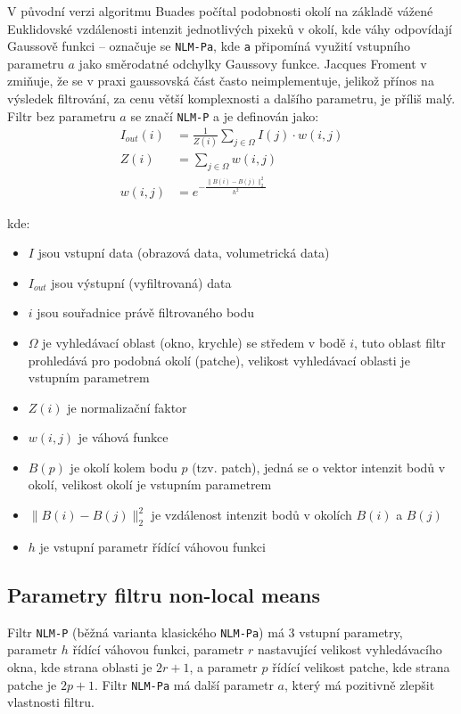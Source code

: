 V původní verzi algoritmu \cite{nlm2005:buades} Buades počítal podobnosti okolí na základě vážené Euklidovské vzdálenosti intenzit jednotlivých pixeků v okolí, kde váhy odpovídají Gaussově funkci -- označuje se \texttt{NLM-Pa}, kde \texttt{a} připomíná využití vstupního parametru $a$ jako směrodatné odchylky Gaussovy funkce. Jacques Froment v \cite{nlm2014:froment} zmiňuje, že se v praxi gaussovská část často neimplementuje, jelikož přínos na výsledek filtrování, za cenu větší komplexnosti a dalšího parametru, je příliš malý. Filtr bez parametru $a$ se značí \texttt{NLM-P} a je definován jako: 
\begin{align}
    \label{eq:nlm}
    I_{out}(i) &= \frac{1}{Z(i)}\displaystyle\sum_{j\in\Omega}{I(j) \cdot w(i, j)} \\
    Z(i) &= \displaystyle\sum_{j\in\Omega}{w(i, j)} \\
    w(i, j) &= e^{-\frac{\|B(i) - B(j)\|_2^2}{h^2}}
\end{align}

kde:
\begin{itemize}
    \item $I$ jsou vstupní data (obrazová data, volumetrická data)
    \item $I_{out}$ jsou výstupní (vyfiltrovaná) data
    \item $i$ jsou souřadnice právě filtrovaného bodu
    \item $\Omega$ je vyhledávací oblast (okno, krychle) se středem v bodě $i$, tuto oblast filtr prohledává pro podobná okolí (patche), velikost vyhledávací oblasti je vstupním parametrem
    \item $Z(i)$ je normalizační faktor
    \item $w(i,j)$ je váhová funkce
    \item $B(p)$ je okolí kolem bodu $p$ (tzv. patch), jedná se o vektor intenzit bodů v okolí, velikost okolí je vstupním parametrem
    \item $\|B(i) - B(j)\|_2^2$ je  vzdálenost intenzit bodů v okolích $B(i)$ a $B(j)$
    \item $h$ je vstupní parametr řídící váhovou funkci
\end{itemize}

\subsection*{Parametry filtru non-local means}
Filtr \texttt{NLM-P} (běžná varianta klasického \texttt{NLM-Pa}) má 3 vstupní parametry, parametr $h$ řídící váhovou funkci, parametr $r$ nastavující velikost vyhledávacího okna, kde strana oblasti je $2r + 1$, a parametr $p$ řídící velikost patche, kde strana patche je $2p + 1$. Filtr \texttt{NLM-Pa} má další parametr $a$, který má pozitivně zlepšit vlastnosti filtru. 

